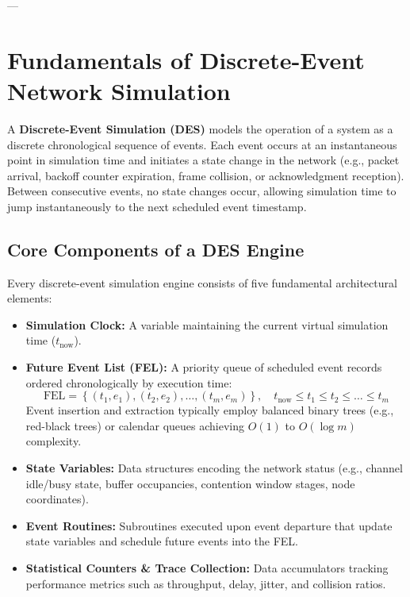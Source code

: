 ---

\section{Fundamentals of Discrete-Event Network Simulation}
\label{sec:des_fundamentals}

A \textbf{Discrete-Event Simulation (DES)} models the operation of a system as a discrete chronological sequence of events. Each event occurs at an instantaneous point in simulation time and initiates a state change in the network (e.g., packet arrival, backoff counter expiration, frame collision, or acknowledgment reception). Between consecutive events, no state changes occur, allowing simulation time to jump instantaneously to the next scheduled event timestamp.

\subsection{Core Components of a DES Engine}
Every discrete-event simulation engine consists of five fundamental architectural elements:
\begin{itemize}
    \item \textbf{Simulation Clock:} A variable maintaining the current virtual simulation time ($t_{\text{now}}$).
    \item \textbf{Future Event List (FEL):} A priority queue of scheduled event records ordered chronologically by execution time:
    \begin{equation}
        \text{FEL} = \left\{ (t_1, e_1), (t_2, e_2), \dots, (t_m, e_m) \right\}, \quad t_{\text{now}} \le t_1 \le t_2 \le \dots \le t_m
    \end{equation}
    Event insertion and extraction typically employ balanced binary trees (e.g., red-black trees) or calendar queues achieving $O(1)$ to $O(\log m)$ complexity.
    \item \textbf{State Variables:} Data structures encoding the network status (e.g., channel idle/busy state, buffer occupancies, contention window stages, node coordinates).
    \item \textbf{Event Routines:} Subroutines executed upon event departure that update state variables and schedule future events into the FEL.
    \item \textbf{Statistical Counters \& Trace Collection:} Data accumulators tracking performance metrics such as throughput, delay, jitter, and collision ratios.
\end{itemize}

